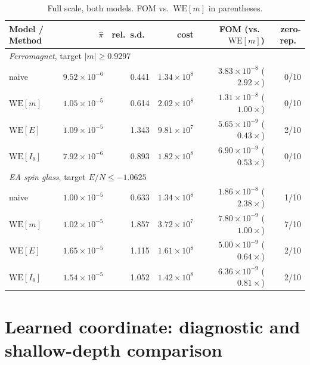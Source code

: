 \documentclass[11pt]{article}
\begin{document}
\begin{table}[h]
	\centering\small
	\caption{Full scale, both models. FOM vs.\ $\mathrm{WE}[m]$ in parentheses.}
	\label{tab:prefix}
	\begin{tabular}{lrrrrr}
		\toprule
		Model / Method & $\hat\pi$ & rel.\ s.d.\ & cost & FOM (vs.\ $\mathrm{WE}[m]$) & zero-rep.\ \\
		\midrule
		\multicolumn{6}{l}{\emph{Ferromagnet}, target $|m|\ge0.9297$} \\
		naive & $9.52\times10^{-6}$ & 0.441 & $1.34\times10^{8}$ & $3.83\times10^{-8}$ ($2.92\times$) & 0/10 \\
		$\mathrm{WE}[m]$ & $1.05\times10^{-5}$ & 0.614 & $2.02\times10^{8}$ & $1.31\times10^{-8}$ ($1.00\times$) & 0/10 \\
		$\mathrm{WE}[E]$ & $1.09\times10^{-5}$ & 1.343 & $9.81\times10^{7}$ & $5.65\times10^{-9}$ ($0.43\times$) & 2/10 \\
		$\mathrm{WE}[I_\theta]$ & $7.92\times10^{-6}$ & 0.893 & $1.82\times10^{8}$ & $6.90\times10^{-9}$ ($0.53\times$) & 0/10 \\
		\multicolumn{6}{l}{\emph{EA spin glass}, target $E/N\le-1.0625$} \\
		naive & $1.00\times10^{-5}$ & 0.633 & $1.34\times10^{8}$ & $1.86\times10^{-8}$ ($2.38\times$) & 1/10 \\
		$\mathrm{WE}[m]$ & $1.02\times10^{-5}$ & 1.857 & $3.72\times10^{7}$ & $7.80\times10^{-9}$ ($1.00\times$) & 7/10 \\
		$\mathrm{WE}[E]$ & $1.65\times10^{-5}$ & 1.115 & $1.61\times10^{8}$ & $5.00\times10^{-9}$ ($0.64\times$) & 2/10 \\
		$\mathrm{WE}[I_\theta]$ & $1.54\times10^{-5}$ & 1.052 & $1.42\times10^{8}$ & $6.36\times10^{-9}$ ($0.81\times$) & 2/10 \\
		\bottomrule
	\end{tabular}
\end{table}

\section{Learned coordinate: diagnostic and shallow-depth comparison}
\end{document}
